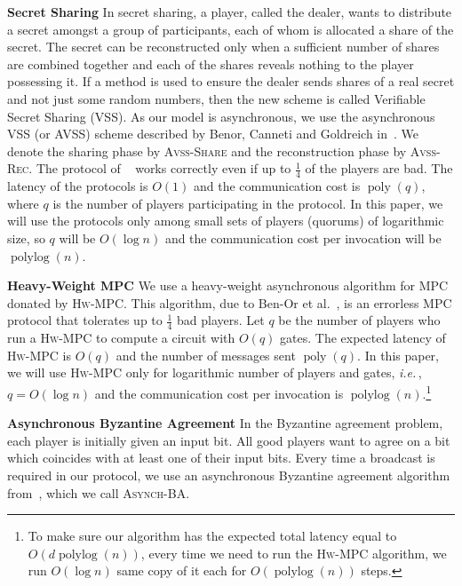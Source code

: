 \documentclass[10pt]{llncs}
\newcommand{\ie}{\emph{i.e.\,}}
\DeclareMathOperator{\polylog}{polylog}
\DeclareMathOperator{\poly}{poly}
\newcommand{\vssSh}{\textsc{Avss-Share}\xspace}
\newcommand{\vssRec}{\textsc{Avss-Rec}\xspace}
\newcommand{\hw}{\textsc{Hw-MPC}\xspace}
\newcommand{\ba}{\textsc{Asynch-BA}\xspace}
\begin{document}
\smallskip
\noindent
{\bf Secret Sharing} In secret sharing, a player, called the
dealer, wants to distribute a secret amongst a group of participants,
each of whom is allocated a share of the secret. The secret can be
reconstructed only when a sufficient number of shares are combined
together and each of the shares reveals nothing to the player
possessing it. If a method is used to ensure the dealer sends shares
of a real secret and not just some random numbers, then the new scheme
is called Verifiable Secret Sharing (VSS). As our model is
asynchronous, we use the asynchronous VSS (or AVSS) scheme described
by Benor, Canneti and Goldreich
in~\cite{benor_canetti_goldreich:asynchronous}. We denote the sharing
phase by \vssSh and the reconstruction phase by \vssRec. The protocol
of ~\cite{benor_canetti_goldreich:asynchronous} works correctly even
if up to $\frac14$ of the players are bad. The latency of the
protocols is $O(1)$ and the communication cost is $\poly(q)$, where
$q$ is the number of players participating in the protocol. In this
paper, we will use the protocols only among small sets of players
(quorums) of logarithmic size, so $q$ will be $O(\log{n})$ and the
communication cost per invocation will be $\polylog(n)$.

\smallskip
\noindent
{\bf Heavy-Weight MPC} We use a heavy-weight asynchronous
algorithm for MPC donated by \hw. This algorithm, due to Ben-Or et
al.~\cite{benor_canetti_goldreich:asynchronous}, is an errorless MPC
protocol that tolerates up to $\frac14$ bad players. Let $q$ be the number
of players who run a \hw to compute a circuit with $O(q)$ gates. The
expected latency of \hw is $O(q)$ and the number of messages 
sent $\poly(q)$. In this paper, we will use \hw only for
logarithmic number of players and gates, \ie, $q = O(\log{n})$ and the
communication cost per invocation is $\polylog(n)$.\footnote{To make sure 
our algorithm has the expected total latency equal to $O(d \polylog(n))$, 
every time we need to run the \hw algorithm, we run $O(\log{n})$ same 
copy of it each for $O(\polylog(n))$ steps.}

\smallskip
\noindent
{\bf Asynchronous Byzantine Agreement} In the Byzantine agreement
problem, each player is initially given an input bit. All good players
want to agree on a bit which coincides with at least one of their
input bits. Every time a broadcast is required in our protocol, we use
an asynchronous Byzantine agreement algorithm from~\cite{canetti}, which we
call \ba.
\end{document}
